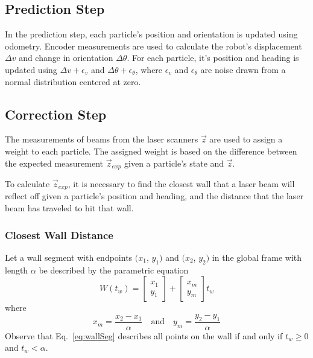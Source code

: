 \documentclass[conference]{../IEEEtran}
\begin{document}
\subsection{Prediction Step}

In the prediction step, each particle's position and orientation is updated using
odometry. Encoder measurements are used to calculate the robot's displacement $\Delta v$
and change in orientation $\Delta \theta$. For each particle, it's position and heading is
updated using $\Delta v + \epsilon_v$ and $\Delta \theta + \epsilon_{\theta}$, where
$\epsilon_v$ and $\epsilon_{\theta}$ are noise drawn from a normal distribution centered
at zero.


\subsection{Correction Step}

The measurements of beams from the laser scanners $\vec{z}$ are used to assign a weight to
each particle. The assigned weight is based on the difference between  the expected
measurement $\vec{z}_{exp}$ given a particle's state and $\vec{z}$.

To calculate $\vec{z}_{exp}$, it is necessary to find the closest wall that a laser beam
will reflect off given a particle's position and heading, and the distance that the laser
beam has traveled to hit that wall.

\subsubsection{Closest Wall Distance}

Let a wall segment with endpoints $(x_1$, $y_1)$ and $(x_2$, $y_2)$ in the global frame
with length $\alpha$ be described by the parametric equation
\begin{equation}
  W(t_w) = \begin{bmatrix}
    x_1\\y_1
    \end{bmatrix} +
    \begin{bmatrix}
    x_m\\ y_m
  \end{bmatrix} t_w
  \label{eq:wallSeg}
\end{equation}
where
\begin{equation}
  x_m = \frac{x_2-x_1}{\alpha} \quad \text{and} \quad y_m = \frac{y_2-y_1}{\alpha}
\label{eq:unit}
\end{equation}
Observe that Eq.~\ref{eq:wallSeg} describes all points on the wall if and only if $t_w \ge
0$ and $t_w < \alpha$.
\end{document}

